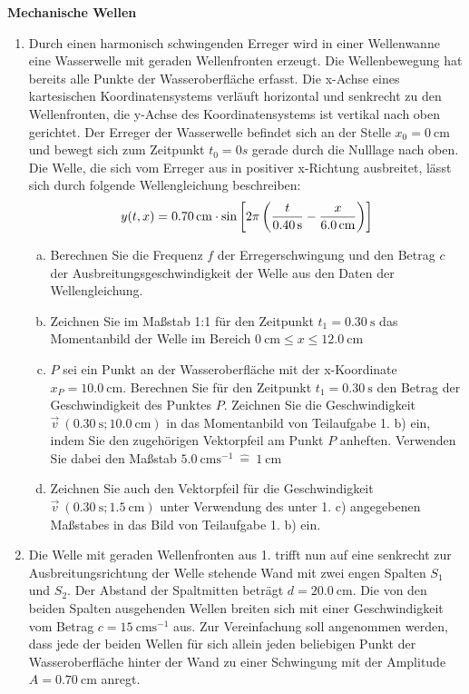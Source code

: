 \documentclass[a4paper]{article}
\begin{document}
{\bf Mechanische Wellen }\\
\begin{enumerate}[1.]
\item Durch einen harmonisch schwingenden Erreger wird in einer Wellenwanne eine Wasserwelle mit geraden Wellenfronten erzeugt. Die Wellenbewegung hat bereits alle Punkte der Wasseroberfläche erfasst. Die x-Achse eines kartesischen Koordinatensystems verläuft horizontal und senkrecht zu den Wellenfronten, die y-Achse des Koordinatensystems ist vertikal nach oben gerichtet. Der Erreger der Wasserwelle befindet sich an der Stelle $x_0=\SI{0}{\centi\meter}$ und bewegt sich zum Zeitpunkt $t_0=0s$ gerade durch die Nulllage nach oben. Die Welle, die sich vom Erreger aus in positiver x-Richtung ausbreitet, lässt sich durch folgende Wellengleichung beschreiben: 
$$y(t,x)=\SI{0,70}{\centi\meter} \cdot \sin{ \left[ 2 \pi \left( {t \over \SI{0,40}{\second}}-{x \over \SI{6,0}{\centi\meter}} \right) \right]}$$

\begin{enumerate}[a)]
\item Berechnen Sie die Frequenz $f$ der Erregerschwingung und den Betrag $c$ der Ausbreitungsgeschwindigkeit der Welle aus den Daten der Wellen\-gleichung.
\item Zeichnen Sie im Maßstab 1:1 für den Zeitpunkt $t_1=\SI{0,30}{\second}$ das Momentanbild der Welle im
Bereich $ \SI{0}{\centi\meter} \le x \le \SI{12,0}{\centi\meter}$
\item $P$ sei ein Punkt an der Wasseroberfläche mit der x-Koordinate $x_P=\SI{10,0}{\centi\meter}$. Berechnen Sie für den Zeitpunkt $t_1=\SI{0,30}{\second}$ den Betrag der Geschwindigkeit des Punktes $P$. Zeichnen Sie die Geschwindigkeit $\vec{v}~ (\SI{0,30}{\second}; \SI{10,0}{\centi\meter})$ in das Momentanbild von Teilaufgabe 1. b) ein, indem Sie den zugehörigen Vektorpfeil am Punkt $P$ anheften. Verwenden Sie dabei den Maßstab 
$\SI{5,0}{\centi\meter\second^{-1}} ~\hat{=} ~\SI{1}{\centi\meter}$
\item Zeichnen Sie auch den Vektorpfeil für die Geschwindigkeit $\vec{v} ~(\SI{0,30}{\second}; \SI{1,5}{\centi\meter})$ unter Verwendung des unter 1. c) angegebenen Maßstabes in das Bild von Teilaufgabe 1. b) ein.
\end{enumerate}

\item Die Welle mit geraden Wellenfronten aus 1. trifft nun auf eine senkrecht zur Ausbreitungsrichtung der Welle stehende Wand mit zwei engen Spalten $S_1$ und $S_2$. Der Abstand der Spaltmitten beträgt $d=\SI{20,0}{\centi\meter}$. Die von den beiden Spalten ausgehenden Wellen breiten sich mit einer Geschwindigkeit vom Betrag $c=\SI{15}{\centi\meter\second^{-1}}$ aus. Zur Vereinfachung soll angenommen werden, dass jede der beiden Wellen für sich allein jeden beliebigen Punkt der Wasseroberfläche hinter der Wand zu einer Schwingung mit der Amplitude $A=\SI{0,70}{\centi\meter}$ anregt. 
  

\end{enumerate}
\end{document}
